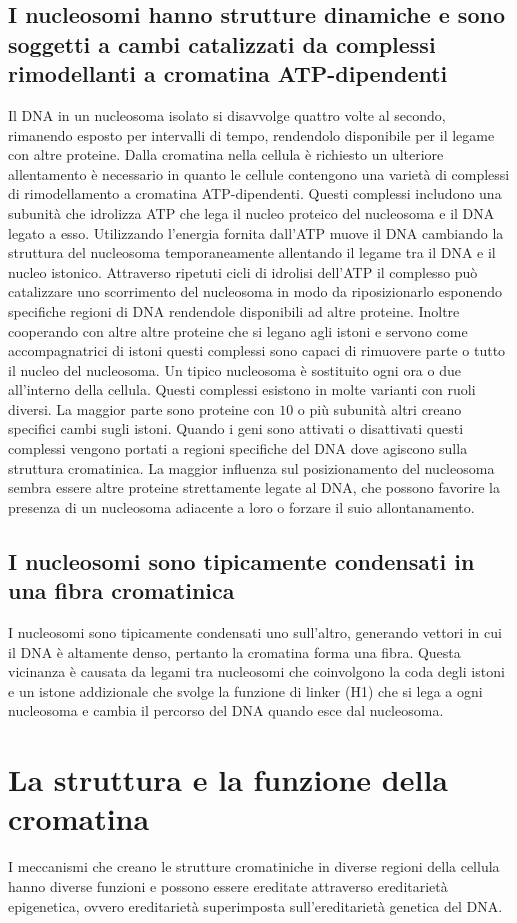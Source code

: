 \subsection{I nucleosomi hanno strutture dinamiche e sono soggetti a cambi catalizzati da complessi rimodellanti a cromatina ATP-dipendenti}
Il DNA in un nucleosoma isolato si disavvolge quattro volte al secondo, rimanendo esposto per intervalli di tempo, rendendolo disponibile per il legame con altre proteine. Dalla
cromatina nella cellula \`e richiesto un ulteriore allentamento \`e necessario in quanto le cellule contengono una variet\`a di complessi di rimodellamento a cromatina ATP-dipendenti.
Questi complessi includono una subunit\`a che idrolizza ATP che lega il nucleo proteico del nucleosoma e il DNA legato a esso. Utilizzando l'energia fornita dall'ATP muove il DNA
cambiando la struttura del nucleosoma temporaneamente allentando il legame tra il DNA e il nucleo istonico. Attraverso ripetuti cicli di idrolisi dell'ATP il complesso pu\`o catalizzare
uno scorrimento del nucleosoma in modo da riposizionarlo esponendo specifiche regioni di DNA rendendole disponibili ad altre proteine. Inoltre cooperando con altre altre proteine che si
legano agli istoni e servono come accompagnatrici di istoni questi complessi sono capaci di rimuovere parte o tutto il nucleo del nucleosoma. Un tipico nucleosoma \`e sostituito ogni
ora o due all'interno della cellula. Questi complessi esistono in molte varianti con ruoli diversi. La maggior parte sono proteine con $10$ o pi\`u subunit\`a altri creano specifici
cambi sugli istoni. Quando i geni sono attivati o disattivati questi complessi vengono portati a regioni specifiche del DNA dove agiscono sulla struttura cromatinica. La maggior 
influenza sul posizionamento del nucleosoma sembra essere altre proteine strettamente legate al DNA, che possono favorire la presenza di un nucleosoma adiacente a loro o forzare il 
suio allontanamento. 
\subsection{I nucleosomi sono tipicamente condensati in una fibra cromatinica}
I nucleosomi sono tipicamente condensati uno sull'altro, generando vettori in cui il DNA \`e altamente denso, pertanto la cromatina forma una fibra. Questa vicinanza \`e causata da 
legami tra nucleosomi che coinvolgono la coda degli istoni e un istone addizionale che svolge la funzione di linker (H1) che si lega a ogni nucleosoma e cambia il percorso del DNA 
quando esce dal nucleosoma. 
\section{La struttura e la funzione della cromatina}
I meccanismi che creano le strutture cromatiniche in diverse regioni della cellula hanno diverse funzioni e possono essere ereditate attraverso ereditariet\`a epigenetica, ovvero 
ereditariet\`a superimposta sull'ereditariet\`a genetica del DNA. 
